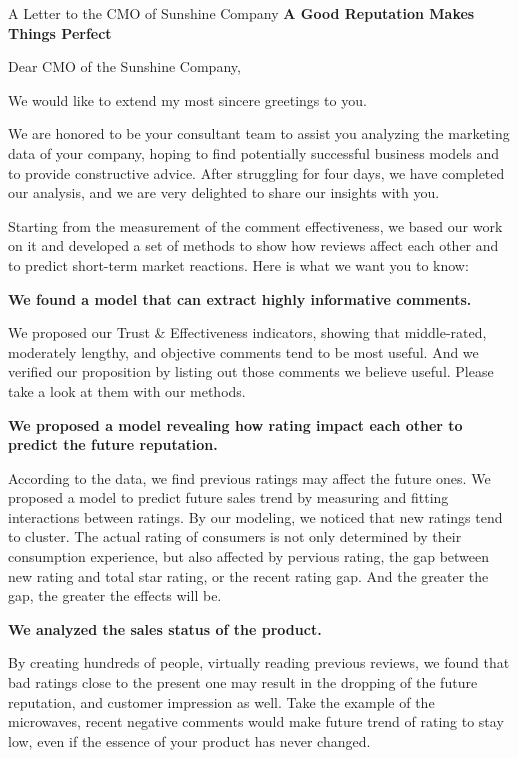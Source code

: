 \documentclass[12pt]{article}  %
\begin{document}
 \begin{letter}{A Letter to the CMO of Sunshine Company}
   \noindent
   \textbf{\Large A Good Reputation Makes Things Perfect}
   
\noindent
Dear CMO of the Sunshine Company,

We would like to extend my most sincere greetings to you.

​We are honored to be your consultant team to assist you analyzing the marketing data of your company, hoping to find potentially successful business models and to provide constructive advice. After struggling for four days, we have completed our analysis, and we are very delighted to share our insights with you.

​Starting from the measurement of the comment effectiveness, we based our work on it and developed a set of methods to show how reviews affect each other and to predict short-term market reactions. Here is what we want you to know:

\noindent
\textbf{We ​found a model that can extract highly informative comments.}

    We proposed our Trust \& Effectiveness indicators, showing that middle-rated, moderately lengthy, and objective comments tend to be most useful. And we verified our proposition by listing out those comments we believe useful. Please take a look at them with our methods.

\noindent
\textbf{We proposed a model revealing how rating impact each other to predict the future reputation.}
    
    According to the data, we find previous ratings may affect the future ones. We proposed a model to predict future sales trend by measuring and fitting interactions between ratings. By our modeling, we noticed that new ratings tend to cluster. The actual rating of consumers is not only determined by their consumption experience, but also affected by pervious rating, the gap between new rating and total star rating, or the recent rating gap. And the greater the gap, the greater the effects will be.

\noindent
\textbf{We analyzed the sales status of the product.}
    
By creating hundreds of people, virtually reading previous reviews, we found that bad ratings close to the present one may result in the dropping of the future reputation, and customer impression as well. Take the example of the microwaves, recent negative comments would make future trend of rating to stay low, even if the essence of your product has never changed.


\end{letter}
\end{document}

